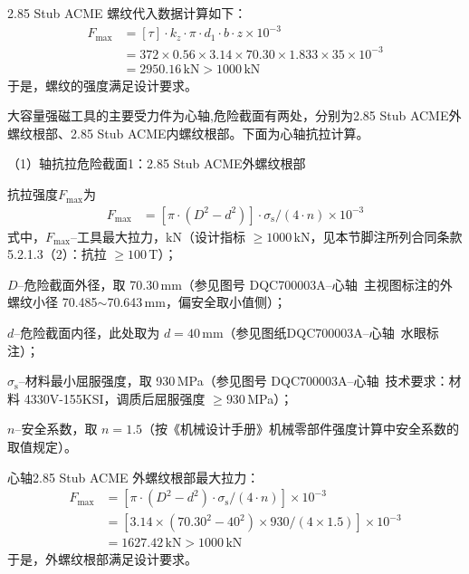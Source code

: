 2.85 Stub ACME 螺纹代入数据计算如下：
\begin{equation}
    \begin{aligned}
        F_{\max} &= [\tau] \cdot k_z \cdot \pi \cdot d_1 \cdot b \cdot z \times 10^{-3} \\
                &= 372 \times 0.56 \times 3.14 \times 70.30 \times 1.833 \times 35 \times 10^{-3} \\
                &= 2950.16 \, \text{kN} > 1000 \, \text{kN}
    \end{aligned}
\end{equation}
于是，螺纹的强度满足设计要求。

大容量强磁工具的主要受力件为心轴,危险截面有两处，分别为2.85 Stub ACME外螺纹根部、2.85 Stub ACME内螺纹根部。下面为心轴抗拉计算。

（1）轴抗拉危险截面1：2.85 Stub ACME外螺纹根部

抗拉强度$F_{\max}$为
\begin{equation}
    \begin{aligned}
        F_{\max} &= \left[\pi \cdot (D^2 - d^2)\right] \cdot \sigma_{\mathrm{s}} / (4 \cdot n) \times 10^{-3}
    \end{aligned}
\end{equation}
式中，$F_{\max}$--工具最大拉力，kN（设计指标 $\ge 1000$\,kN，见本节脚注所列合同条款 5.2.1.3（2）：抗拉 $\ge 100$\,T）；

$D$--危险截面外径，取 70.30\,mm（参见图号 DQC700003A--心轴\ 主视图标注的外螺纹小径 70.485$\sim$70.643\,mm，偏安全取小值侧）；

$d$--危险截面内径，此处取为 $d = 40\,\text{mm}$（参见图纸DQC700003A--心轴\ 水眼标注）；

$\sigma_\mathrm{s}$--材料最小屈服强度，取 930\,MPa（参见图号 DQC700003A--心轴\ 技术要求：材料 4330V-155KSI，调质后屈服强度 $\ge 930$\,MPa）；

$n$--安全系数，取 $n = 1.5$（按《机械设计手册》机械零部件强度计算中安全系数的取值规定\cite{ref26}）。

心轴2.85 Stub ACME 外螺纹根部最大拉力：
\begin{equation}
    \begin{aligned}
            F_{\max} &= \left[\pi \cdot (D^2 - d^2) \cdot \sigma_{\mathrm{s}} / (4 \cdot n)\right] \times 10^{-3} \\
                    &= \left[3.14 \times (70.30^2 - 40^2) \times 930 / (4 \times 1.5)\right] \times 10^{-3} \\
                    &= 1627.42 \, \text{kN} > 1000 \, \text{kN}
        \end{aligned}
\end{equation}
于是，外螺纹根部满足设计要求。

